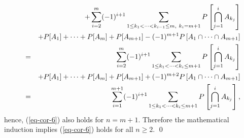 \begin{enumerate}
\begin{solution}
\begin{eqnarray*}
		\\&&+ \sum_{i=2}^{m} (-1)^{i+1} \sum_{1\leq k_1<\cdots<k_{i-1} \leq m,\ k_i = m+1} P\left[\bigcap_{j=1}^{i} A_{k_j}\right]
		\\&& + P[A_1] + \cdots + P[A_m] + P[A_{m+1}] - (-1)^{m+1}P\left[A_1\cap \cdots \cap A_{m+1}\right]
		\\&=& \sum_{i=2}^m (-1)^{i+1} \sum_{1\leq k_1<\cdots<k_i \leq m+1} P\left[\bigcap_{j=1}^i A_{k_j}\right]
		\\&& + P[A_1] + \cdots + P[A_m] + P[A_{m+1}] + (-1)^{m+2}P\left[A_1\cap \cdots \cap A_{m+1}\right]
		\\&=& \sum_{i=1}^{m+1} (-1)^{i+1} \sum_{1\leq k_1<\cdots<k_i \leq m+1} P\left[\bigcap_{j=1}^i A_{k_j}\right],
	\end{eqnarray*}
	hence, (\ref{eq-cor-6}) also holds for $n=m+1$.
	Therefore the mathematical induction implies
	(\ref{eq-cor-6}) holds for all $n\geq2$.
	\qed



	\end{solution}

\fi

\end{enumerate}


